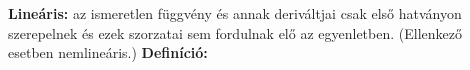 \documentclass[11pt,a4paper]{article}
\begin{document}
    \begin{tcolorbox}[colback=red!5!white,colframe=red!60!black,title= 5. Lineáris állandó együtthatós DE]
        \textbf{Lineáris:} az ismeretlen függvény és annak deriváltjai csak első hatványon szerepelnek és
        ezek szorzatai sem fordulnak elő az egyenletben. (Ellenkező esetben nemlineáris.)
        \textbf{Definíció:}
    \end{tcolorbox}
\end{document}
